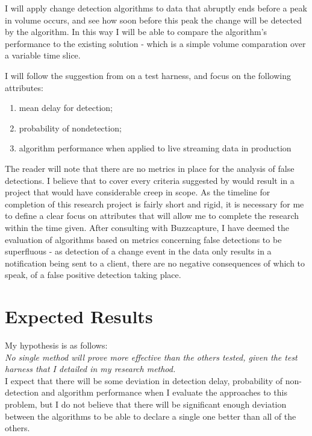 \documentclass{uvamscse}
\begin{document}
I will apply change detection algorithms to data that abruptly ends before a peak in volume occurs, and see how soon before this peak the change will be detected by the algorithm. In this way I will be able to compare the algorithm’s performance to the existing solution - which is a simple volume comparation over a variable time slice.

I will follow the suggestion from \citeauthor{basseville1993detection} on a test harness, and focus on the following attributes:
\begin{enumerate}
	\item mean delay for detection;
	\item probability of nondetection;
	\item algorithm performance when applied to live streaming data in production
\end{enumerate}

The reader will note that there are no metrics in place for the analysis of false detections. I believe that to cover every criteria suggested by \citeauthor{basseville1993detection} would result in a project that would have considerable creep in scope. As the timeline for completion of this research project is fairly short and rigid, it is necessary for me to define a clear focus on attributes that will allow me to complete the research within the time given. After consulting with Buzzcapture, I have deemed the evaluation of algorithms based on metrics concerning false detections to be superfluous - as detection of a change event in the data only results in a notification being sent to a client, there are no negative consequences of which to speak, of a false positive detection taking place.

\section{Expected Results}

My hypothesis is as follows:\\

\noindent\textit{No single method will prove more effective than the others tested, given the test harness that I detailed in my research method.}\\

\noindent I expect that there will be some deviation in detection delay, probability of non-detection and algorithm performance when I evaluate the approaches to this problem, but I do not believe that there will be significant enough deviation between the algorithms to be able to declare a single one better than all of the others.
\end{document}
